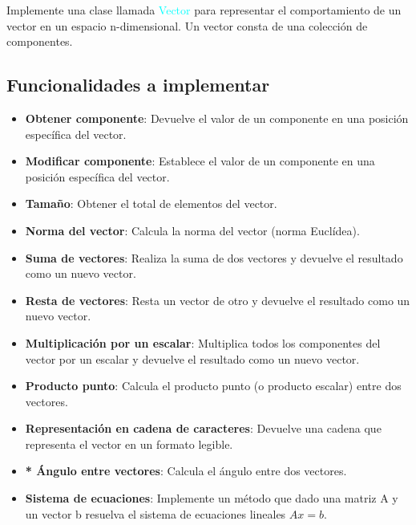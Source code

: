 Implemente una clase llamada \textcolor{cyan}{Vector} para representar el comportamiento de un vector en un espacio n-dimensional. Un vector consta de una colección de componentes.

\subsection*{Funcionalidades a implementar}
\begin{itemize}
    \item \textbf{Obtener componente}: Devuelve el valor de un componente en una posición específica del vector.
    \item \textbf{Modificar componente}: Establece el valor de un componente en una posición específica del vector.
    \item \textbf{Tamaño}: Obtener el total de elementos del vector.
    \item \textbf{Norma del vector}: Calcula la norma del vector (norma Euclídea).
    \item \textbf{Suma de vectores}: Realiza la suma de dos vectores y devuelve el resultado como un nuevo vector.
    \item \textbf{Resta de vectores}: Resta un vector de otro y devuelve el resultado como un nuevo vector.
    \item \textbf{Multiplicación por un escalar}: Multiplica todos los componentes del vector por un escalar y devuelve el resultado como un nuevo vector.
    \item \textbf{Producto punto}: Calcula el producto punto (o producto escalar) entre dos vectores.
    \item \textbf{Representación en cadena de caracteres}: Devuelve una cadena que representa el vector en un formato legible.
    \item \textbf{* Ángulo entre vectores}: Calcula el ángulo entre dos vectores.
    \item \textbf{Sistema de ecuaciones}: Implemente un método que dado una matriz A y un vector b resuelva el sistema de ecuaciones lineales $Ax = b$.
\end{itemize}
